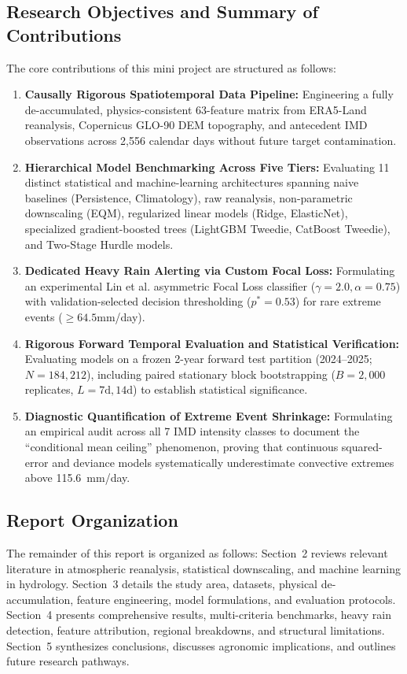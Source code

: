 \documentclass[12pt]{article}
\begin{document}
\subsection{Research Objectives and Summary of Contributions}
The core contributions of this mini project are structured as follows:
\begin{enumerate}
    \item \textbf{Causally Rigorous Spatiotemporal Data Pipeline:} Engineering a fully de-accumulated, physics-consistent 63-feature matrix from ERA5-Land reanalysis, Copernicus GLO-90 DEM topography, and antecedent IMD observations across 2,556 calendar days without future target contamination.
    \item \textbf{Hierarchical Model Benchmarking Across Five Tiers:} Evaluating 11 distinct statistical and machine-learning architectures spanning naive baselines (Persistence, Climatology), raw reanalysis, non-parametric downscaling (EQM), regularized linear models (Ridge, ElasticNet), specialized gradient-boosted trees (LightGBM Tweedie, CatBoost Tweedie), and Two-Stage Hurdle models.
    \item \textbf{Dedicated Heavy Rain Alerting via Custom Focal Loss:} Formulating an experimental Lin et al. \cite{lin2017} asymmetric Focal Loss classifier ($\gamma = 2.0, \alpha = 0.75$) with validation-selected decision thresholding ($p^* = 0.53$) for rare extreme events ($\ge 64.5$\;mm/day).
    \item \textbf{Rigorous Forward Temporal Evaluation and Statistical Verification:} Evaluating models on a frozen 2-year forward test partition (2024--2025; $N = 184,212$), including paired stationary block bootstrapping ($B = 2,000$ replicates, $L = 7\text{d}, 14\text{d}$) to establish statistical significance.
    \item \textbf{Diagnostic Quantification of Extreme Event Shrinkage:} Formulating an empirical audit across all 7 IMD intensity classes to document the ``conditional mean ceiling'' phenomenon, proving that continuous squared-error and deviance models systematically underestimate convective extremes above 115.6~mm/day.
\end{enumerate}

\subsection{Report Organization}
The remainder of this report is organized as follows: Section~2 reviews relevant literature in atmospheric reanalysis, statistical downscaling, and machine learning in hydrology. Section~3 details the study area, datasets, physical de-accumulation, feature engineering, model formulations, and evaluation protocols. Section~4 presents comprehensive results, multi-criteria benchmarks, heavy rain detection, feature attribution, regional breakdowns, and structural limitations. Section~5 synthesizes conclusions, discusses agronomic implications, and outlines future research pathways.
\end{document}
